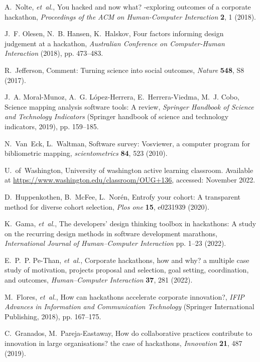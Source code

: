 \documentclass{ieeeaccess}
\begin{document}
\begin{thebibliography}{10}
A.~Nolte, {\it et~al.\/}, You hacked and now what? -exploring outcomes of a
  corporate hackathon, {\it Proceedings of the ACM on Human-Computer
  Interaction\/} {\bf 2}, 1 (2018).

J.~F. Olesen, N.~B. Hansen, K.~Halskov, Four factors informing design judgement
  at a hackathon, {\it Australian Conference on Computer-Human Interaction\/}
  (2018), pp. 473--483.

R.~Jefferson, Comment: Turning science into social outcomes, {\it Nature\/}
  {\bf 548}, S8 (2017).

J.~A. Moral-Munoz, A.~G. López-Herrera, E.~Herrera-Viedma, M.~J. Cobo, Science
  mapping analysis software tools: A review, {\it Springer Handbook of Science
  and Technology Indicators\/} (Springer handbook of science and technology
  indicators, 2019), pp. 159--185.

N.~Van~Eck, L.~Waltman, Software survey: Vosviewer, a computer program for
  bibliometric mapping, {\it scientometrics\/} {\bf 84}, 523 (2010).

U.~of~Washington, University of washington active learning classroom. Available
  at \url{https://www.washington.edu/classroom/OUG+136}, accessed: November
  2022.

D.~Huppenkothen, B.~McFee, L.~Nor{\'e}n, Entrofy your cohort: A transparent
  method for diverse cohort selection, {\it Plos one\/} {\bf 15}, e0231939
  (2020).

K.~Gama, {\it et~al.\/}, The developers’ design thinking toolbox in
  hackathons: A study on the recurring design methods in software development
  marathons, {\it International Journal of Human--Computer Interaction\/} pp.
  1--23 (2022).

E.~P.~P. Pe-Than, {\it et~al.\/}, Corporate hackathons, how and why? a multiple
  case study of motivation, projects proposal and selection, goal setting,
  coordination, and outcomes, {\it Human--Computer Interaction\/} {\bf 37}, 281
  (2022).

M.~Flores, {\it et~al.\/}, How can hackathons accelerate corporate innovation?,
  {\it IFIP Advances in Information and Communication Technology\/} (Springer
  International Publishing, 2018), pp. 167--175.

C.~Granados, M.~Pareja-Eastaway, How do collaborative practices contribute to
  innovation in large organisations? the case of hackathons, {\it Innovation\/}
  {\bf 21}, 487 (2019).


\end{thebibliography}
\end{document}
